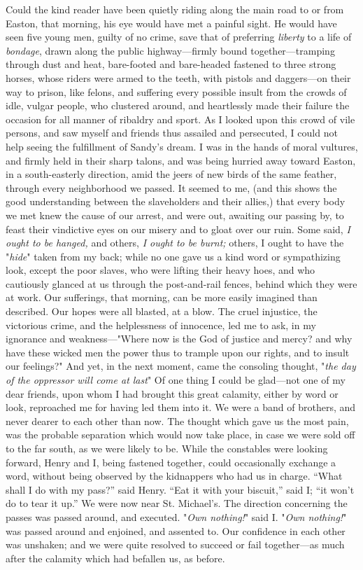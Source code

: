 Could the kind reader have been quietly riding along the main road to or
from Easton, that morning, his eye would have met a painful sight. He
would have seen five young men, guilty of no crime, save that of
preferring \emph{liberty} to a life of \emph{bondage}, drawn {}along the
public highway---firmly bound together---tramping through dust and heat,
bare-footed and bare-headed fastened to three strong horses, whose
riders were armed to the teeth, with pistols and daggers---on their way
to prison, like felons, and suffering every possible insult from the
crowds of idle, vulgar people, who clustered around, and heartlessly
made their failure the occasion for all manner of ribaldry and sport. As
I looked upon this crowd of vile persons, and saw myself and friends
thus assailed and persecuted, I could not help seeing the fulfillment of
Sandy's dream. I was in the hands of moral vultures, and firmly held in
their sharp talons, and was being hurried away toward Easton, in a
south-easterly direction, amid the jeers of new birds of the same
feather, through every neighborhood we passed. It seemed to me, (and
this shows the good understanding between the slaveholders and their
allies,) that every body we met knew the cause of our arrest, and were
out, awaiting our passing by, to feast their vindictive eyes on our
misery and to gloat over our ruin. Some said, \emph{I ought to be
hanged,} and others, \emph{I ought to be burnt;} others, I ought to have
the "\emph{hide}" taken from my back; while no one gave us a kind word
or sympathizing look, except the poor slaves, who were lifting their
heavy hoes, and who cautiously glanced at us through the post-and-rail
fences, behind which they were at work. Our sufferings, that morning,
can be more easily imagined than described. Our hopes were all blasted,
at a blow. The cruel injustice, the victorious crime, and the
helplessness of innocence, led me to ask, in my ignorance and
weakness---"Where now is the God {}of justice and mercy? and why have
these wicked men the power thus to trample upon our rights, and to
insult our feelings?" And yet, in the next moment, came the consoling
thought, "\emph{the day of the oppressor will come at last}" Of one
thing I could be glad---not one of my dear friends, upon whom I had
brought this great calamity, either by word or look, reproached me for
having led them into it. We were a band of brothers, and never dearer to
each other than now. The thought which gave us the most pain, was the
probable separation which would now take place, in case we were sold off
to the far south, as we were likely to be. While the constables were
looking forward, Henry and I, being fastened together, could
occasionally exchange a word, without being observed by the kidnappers
who had us in charge. ``What shall I do with my pass?'' said Henry.
``Eat it with your biscuit,'' said I; ``it won't do to tear it up.'' We
were now near St. Michael's. The direction concerning the passes was
passed around, and executed. "\emph{Own nothing!}" said I. "\emph{Own
nothing!}" was passed around and enjoined, and assented to. Our
confidence in each other was unshaken; and we were quite resolved to
succeed or fail together---as much after the calamity which had befallen
us, as before.

